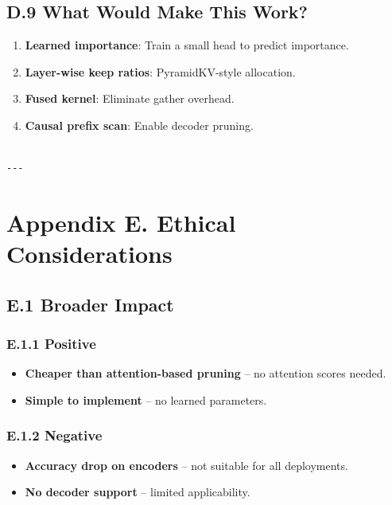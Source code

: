 \subsection{D.9 What Would Make This Work?}

\begin{enumerate}
\item \textbf{Learned importance}: Train a small head to predict importance.
\item \textbf{Layer-wise keep ratios}: PyramidKV-style allocation.
\item \textbf{Fused kernel}: Eliminate gather overhead.
\item \textbf{Causal prefix scan}: Enable decoder pruning.
\end{enumerate}
\begin{lstlisting}

---
\end{lstlisting}


\section{Appendix E. Ethical Considerations}

\subsection{E.1 Broader Impact}

\subsubsection{E.1.1 Positive}

\begin{itemize}
\item \textbf{Cheaper than attention-based pruning} -- no attention scores needed.
\item \textbf{Simple to implement} -- no learned parameters.

\end{itemize}
\subsubsection{E.1.2 Negative}

\begin{itemize}
\item \textbf{Accuracy drop on encoders} -- not suitable for all deployments.
\item \textbf{No decoder support} -- limited applicability.

\end{itemize}
